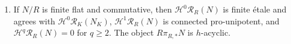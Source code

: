 \begin{theorem}
\begin{enumerate}
write $G_n=G\times_RR/\mathfrak m_R^n$ and
\[
 \mathbf G=\varprojlim_n
 \bigl(\operatorname{Gr}_{R/\mathfrak m_R^n}(G_n)\bigr)^{\mathrm{perf}}.
\]
Then $\mathbf G\in\mathcal P'_{\mathrm{fc}}$ and
\[
 0\longrightarrow U_G\longrightarrow\mathbf G
 \longrightarrow G_k^{\mathrm{perf}}\longrightarrow0
\]
is exact, with $U_G$ connected pro-unipotent.
Consequently $\pi_0(\mathbf G)=\pi_0(G_k)$, and
$\mathcal R_R(G)\simeq\mathbf G[0]$.
The unit condition in the preceding clause holds.
\item If $N/R$ is finite flat and commutative, then
$\mathcal H^0\mathcal R_R(N)$ is finite étale and agrees with
$\mathcal H^0\mathcal R_K(N_K)$,
$\mathcal H^1\mathcal R_R(N)$ is connected pro-unipotent, and
$\mathcal H^q\mathcal R_R(N)=0$ for $q\geq2$.
The object $R\pi_{R,*}N$ is $h$-acyclic.
\end{enumerate}
\end{theorem}

